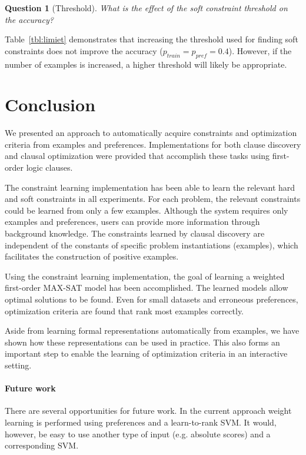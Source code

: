 \documentclass[letterpaper]{article}
\newtheorem{question}{Question}
\theoremstyle{definition}
\begin{document}
\begin{question}[Threshold]
  What is the effect of the soft constraint threshold on the accuracy?
\end{question}

Table~\ref{tbl:limiet} demonstrates that increasing the threshold used for finding soft constraints does not improve the accuracy ($p_{train} = p_{pref} = 0.4$).
However, if the number of examples is increased, a higher threshold will likely be appropriate.


\section{Conclusion}
We presented an approach to automatically acquire constraints and optimization criteria from examples and preferences.
Implementations for both clause discovery and clausal optimization were provided that accomplish these tasks using first-order logic clauses.

The constraint learning implementation has been able to learn the relevant hard and soft constraints in all experiments.
For each problem, the relevant constraints could be learned from only a few examples.
Although the system requires only examples and preferences, users can provide more information through background knowledge.
The constraints learned by clausal discovery are independent of the constants of specific problem instantiations (examples), which facilitates the construction of positive examples.

Using the constraint learning implementation, the goal of learning a weighted first-order MAX-SAT model has been accomplished.
The learned models allow optimal solutions to be found.
Even for small datasets and erroneous preferences, optimization criteria are found that rank most examples correctly.

Aside from learning formal representations automatically from examples, we have shown how these representations can be used in practice.
This also forms an important step to enable the learning of optimization criteria in an interactive setting.

\paragraph{Future work}
There are several opportunities for future work.
In the current approach weight learning is performed using preferences and a learn-to-rank SVM.
It would, however, be easy to use another type of input (e.g. absolute scores) and a corresponding SVM.
\end{document}
